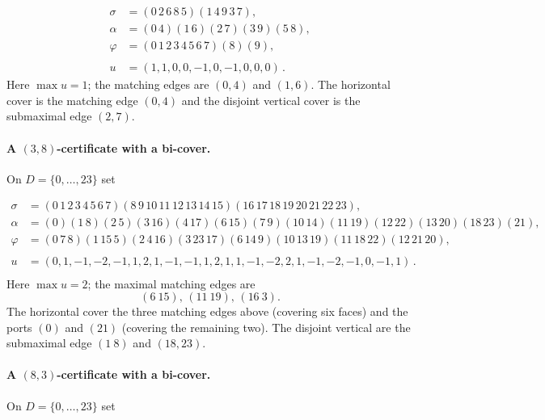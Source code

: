 \documentclass[11pt]{article}
\theoremstyle{remark}
\begin{document}
\begin{equation}
\begin{aligned}
\sigma&=(0\,2\,6\,8\,5)(1\,4\,9\,3\,7),\\[2pt]
\alpha&=(0\,4)(1\,6)(2\,7)(3\,9)(5\,8),\\[2pt]
\varphi&=(0\,1\,2\,3\,4\,5\,6\,7)(8)(9)  ,\\[2pt] \\
u&=(1,1,0,0,-1,0,-1,0,0,0)\,.
\end{aligned}
\label{eq:C85}
\end{equation}
Here $\max u=1$; the matching edges are $(0,4)$ and $(1,6)$.
The horizontal cover is the matching edge $(0,4)$ and the disjoint vertical cover is the submaximal edge $(2,7)$.

\paragraph{A $(3,8)$-certificate with a bi-cover.} On $D=\{0,\dots,23\}$ set


\begin{equation}
\begin{aligned}
\sigma&=
(0\,1\,2\,3\,4\,5\,6\,7)(8\,9\,10\,11\,12\,13\,14\,15)
(16\,17\,18\,19\,20\,21\,22\,23),\\[2pt]
\alpha&=(0)(1\,8)(2\,5)(3\,16)(4\,17)(6\,15)(7\,9)
(10\,14)(11\,19)(12\,22)(13\,20)(18\,23)(21)
,\\[2pt]
\varphi&=(0\,7\, 8)(1\,15\,5)(2\,4\,16)(3\,23\,17)(6\,14\,9)(10\,13\,19)(11\,18\,22)(12\,21\,20) ,\\[2pt] \\
u&=(0,1,-1,-2,-1,1,2,1,-1,-1,1,2,1,1,-1,-2,2,1,-1,-2,-1,0,-1,1) \, .\\
\end{aligned}
\label{eq:C38}
\end{equation}
Here $\max u=2$; the maximal matching edges are 
\[(6\ 15),\, (11\ 19),\,(16\ 3).\]
The horizontal cover the three matching edges above (covering six faces) and the ports $(0)$ and $(21)$ (covering the remaining two). The disjoint vertical are the submaximal edge $(1\ 8)$ and $(18,23)$.


\paragraph{A $(8,3)$-certificate with a bi-cover.} On $D=\{0,\dots,23\}$ set
\end{document}
